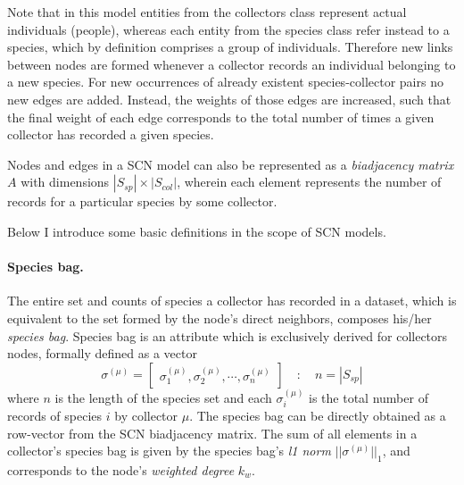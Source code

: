 Note that in this model entities from the collectors class represent actual individuals (people), whereas each entity from the species class refer instead to a species, which by definition comprises a group of individuals. 
Therefore new links between nodes are formed whenever a collector records an individual belonging to a new species. 
For new occurrences of already existent species-collector pairs no new edges are added. Instead, the weights of those edges are increased, such that the final weight of each edge corresponds to the total number of times a given collector has recorded a given species.

Nodes and edges in a SCN model can also be represented as a \textit{biadjacency matrix} $A$ with dimensions $|S_{sp}|\times|S_{col}|$, wherein each element represents the number of records for a particular species by some collector.

Below I introduce some basic definitions in the scope of SCN models.

\paragraph{Species bag.} 
The entire set and counts of species a collector has recorded in a dataset, which is equivalent to the set formed by the node's direct neighbors, composes his/her \textit{species bag}.
Species bag is an attribute which is exclusively derived for collectors nodes, formally defined as a vector
$$
\sigma^{(\mu)} =  \begin{bmatrix}
\sigma_1^{(\mu)}, \sigma_2^{(\mu)}, \cdots, \sigma_n^{(\mu)}
\end{bmatrix}  \quad : \quad 
n = |S_{sp}|
$$
where $n$ is the length of the species set and each $\sigma_i^{(\mu)}$ is the total number of records of species $i$ by collector $\mu$. 
The species bag can be directly obtained as a row-vector from the SCN biadjacency matrix.
The sum of all elements in a collector's species bag is given by the species bag's \textit{l1 norm} $|| \sigma^{(\mu)} ||_1$, and corresponds to the node's \textit{weighted degree} $k_w$.
 
